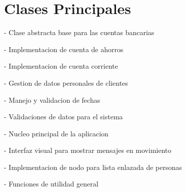 \chapter{Clases Principales }
\hypertarget{clases}{}\label{clases}

\begin{DoxyItemize}
\item {} -\/ Clase abstracta base para las cuentas bancarias
\item {} -\/ Implementacion de cuenta de ahorros
\item {} -\/ Implementacion de cuenta corriente
\item {} -\/ Gestion de datos personales de clientes
\item {} -\/ Manejo y validacion de fechas
\item {} -\/ Validaciones de datos para el sistema
\item {} -\/ Nucleo principal de la aplicacion
\item {} -\/ Interfaz visual para mostrar mensajes en movimiento
\item {} -\/ Implementacion de nodo para lista enlazada de personas
\item {} -\/ Funciones de utilidad general 
\end{DoxyItemize}